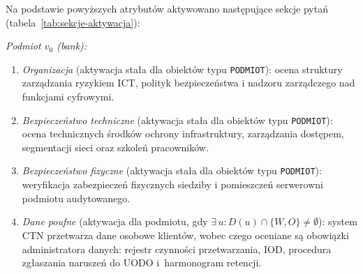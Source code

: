 Na podstawie powyższych atrybutów aktywowano następujące sekcje pytań (tabela~\ref{tab:sekcje-aktywacja}):

\medskip
\noindent\textit{Podmiot $v_0$ (bank):}
\begin{enumerate}[label=(\roman*)]
  \item \textit{Organizacja} (aktywacja stała dla obiektów typu \texttt{PODMIOT}): ocena struktury zarządzania ryzykiem ICT, polityk bezpieczeństwa i nadzoru zarządczego nad funkcjami cyfrowymi.

  \item \textit{Bezpieczeństwo techniczne} (aktywacja stała dla obiektów typu \texttt{PODMIOT}): ocena technicznych środków ochrony infrastruktury, zarządzania dostępem, segmentacji sieci oraz szkoleń pracowników.

  \item \textit{Bezpieczeństwo fizyczne} (aktywacja stała dla obiektów typu \texttt{PODMIOT}): weryfikacja zabezpieczeń fizycznych siedziby i pomieszczeń serwerowni podmiotu audytowanego. 

  \item \textit{Dane poufne} (aktywacja dla podmiotu, gdy $\exists\, u : D(u) \cap \{W, O\} \neq \emptyset$): system CTN przetwarza dane osobowe klientów, wobec czego oceniane są obowiązki administratora danych: rejestr czynności przetwarzania, IOD, procedura zgłaszania naruszeń do UODO i~harmonogram retencji.
\end{enumerate}

